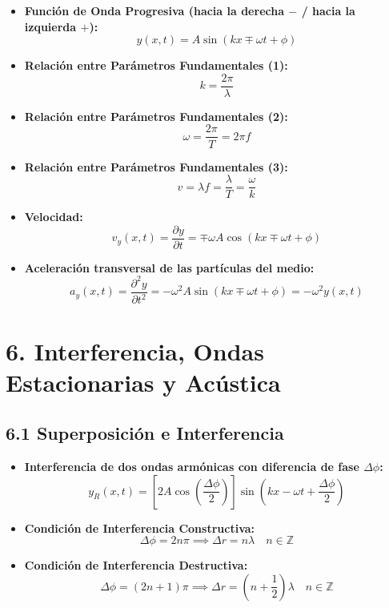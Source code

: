 \documentclass[11pt,a4paper]{article}
\begin{document}
\begin{itemize}
  \item \textbf{Función de Onda Progresiva (hacia la derecha $-$ / hacia la izquierda $+$):}
  \[
    y(x, t) = A \sin(k x \mp \omega t + \phi)
  \]
  \item \textbf{Relación entre Parámetros Fundamentales (1):}
  \[
    k = \frac{2\pi}{\lambda}
  \]
  \item \textbf{Relación entre Parámetros Fundamentales (2):}
  \[
    \omega = \frac{2\pi}{T} = 2\pi f
  \]
  \item \textbf{Relación entre Parámetros Fundamentales (3):}
  \[
    v = \lambda f = \frac{\lambda}{T} = \frac{\omega}{k}
  \]
  \item \textbf{Velocidad:}
  \[
    v_y(x, t) = \frac{\partial y}{\partial t} = \mp \omega A \cos(k x \mp \omega t + \phi)
  \]
  \item \textbf{Aceleración transversal de las partículas del medio:}
  \[
    a_y(x, t) = \frac{\partial^2 y}{\partial t^2} = -\omega^2 A \sin(k x \mp \omega t + \phi) = -\omega^2 y(x, t)
  \]
\end{itemize}

\section*{6. Interferencia, Ondas Estacionarias y Acústica}

\subsection*{6.1 Superposición e Interferencia}

\begin{itemize}
  \item \textbf{Interferencia de dos ondas armónicas con diferencia de fase $\Delta\phi$:}
  \[
    y_R(x, t) = \left[ 2A \cos\left(\frac{\Delta\phi}{2}\right) \right] \sin\left(kx - \omega t + \frac{\Delta\phi}{2}\right)
  \]
  \item \textbf{Condición de Interferencia Constructiva:}
  \[
    \Delta\phi = 2n\pi \implies \Delta r = n\lambda \quad n \in \mathbb{Z}
  \]
  \item \textbf{Condición de Interferencia Destructiva:}
  \[
    \Delta\phi = (2n + 1)\pi \implies \Delta r = \left(n + \frac{1}{2}\right)\lambda \quad n \in \mathbb{Z}
  \]
\end{itemize}
\end{document}
